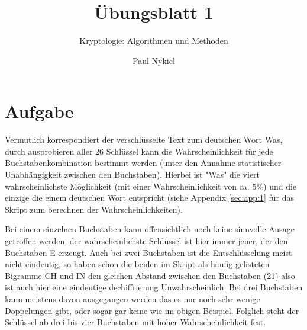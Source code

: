 \documentclass[DIN, pagenumber=false, fontsize=11pt, parskip=half]{scrartcl}
\title{Übungsblatt 1}
\subtitle{Kryptologie: Algorithmen und Methoden}
\author{Paul Nykiel}
\begin{document}
    \maketitle
    
    \section{Aufgabe}
    Vermutlich korrespondiert der verschlüsselte Text zum deutschen Wort \glqq{}Was\grqq{},
    durch ausprobieren aller 26 Schlüssel kann die Wahrscheinlichkeit für jede
    Buchstabenkombination bestimmt werden (unter den Annahme statistischer Unabhängigkeit zwischen den Buchstaben). 
    Hierbei ist "Was" die viert wahrscheinlichste Möglichkeit (mit einer Wahrscheinlichkeit von ca. 5\%) und die einzige die einem deutschen Wort entspricht (siehe Appendix \ref{sec:app:1} für das Skript zum berechnen der Wahrscheinlichkeiten).

    Bei einem einzelnen Buchstaben kann offensichtlich noch keine sinnvolle Ausage getroffen werden, der wahrscheinlichste Schlüssel ist hier immer jener, der den Buchstaben \glqq{}E\grqq{} erzeugt. 
    Auch bei zwei Buchstaben ist die Entschlüsselung meist nicht eindeutig, so haben schon die beiden im Skript als häufig gelisteten Bigramme \glqq{}CH\grqq{} und \glqq{}IN\grqq{} den gleichen Abstand zwischen den Buchstaben (21) also ist auch hier eine eindeutige dechiffrierung Unwahrscheinlich.
    Bei drei Buchstaben kann meistens davon ausgegangen werden das es nur noch sehr wenige Doppelungen gibt, oder sogar gar keine wie im obigen Beispiel.
    Folglich steht der Schlüssel ab drei bis vier Buchstaben mit hoher Wahrscheinlichkeit fest.
\end{document}
